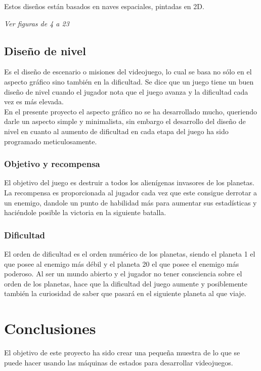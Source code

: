 \documentclass[a4paper,10pt]{article}
\begin{document}
Estos diseños están basados en naves espaciales, pintadas en 2D.

\emph{Ver figuras de 4 a 23}

\subsection{Diseño de nivel}

Es el diseño de escenario o misiones del videojuego, 
lo cual se basa no sólo en el aspecto gráfico sino también 
en la dificultad. Se dice que un juego tiene un buen diseño de nivel 
cuando el jugador nota que el juego avanza y la dificultad cada vez es 
más elevada.\\

En el presente proyecto el aspecto gráfico no se ha desarrollado mucho, 
queriendo darle un aspecto simple y minimalista, sin embargo el desarrollo 
del diseño de nivel en cuanto al aumento de dificultad en cada etapa 
del juego ha sido programado meticulosamente.

\subsubsection{Objetivo y recompensa}

El objetivo del juego es destruir a todos los alienígenas invasores 
de los planetas.
La recompensa es proporcionada al jugador cada vez que este
consigue derrotar a un enemigo, dandole un punto de habilidad 
más para aumentar sus estadísticas y haciéndole posible la victoria 
en la siguiente batalla.

\subsubsection{Dificultad}

El orden de dificultad es el orden numérico de los planetas, 
siendo el planeta 1 el que posee al enemigo más débil y 
el planeta 20 el que posee el enemigo más poderoso.
Al ser un mundo abierto y el jugador no tener consciencia 
sobre el orden de los planetas, hace que la dificultad del 
juego aumente y posiblemente también la curiosidad de saber que 
pasará en el siguiente planeta al que viaje.
\cleardoublepage

\section{Conclusiones}

El objetivo de este proyecto ha sido crear una pequeña muestra de lo que se puede hacer usando 
las máquinas de estados para desarrollar videojuegos.
\end{document}
